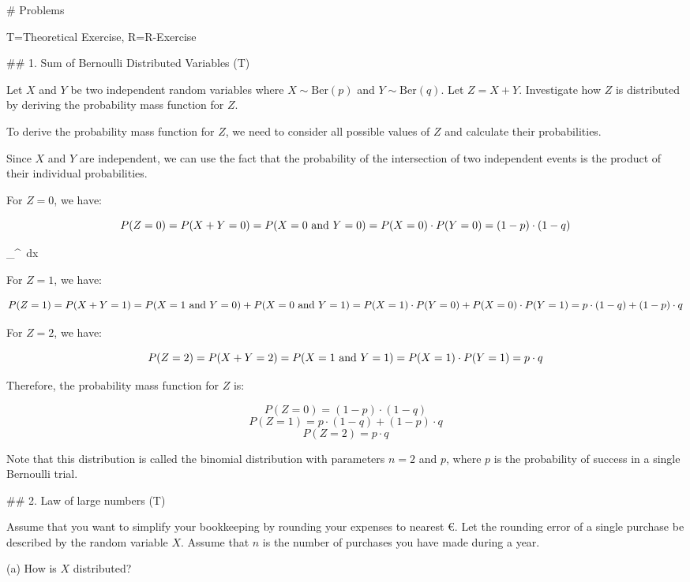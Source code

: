 \documentclass[20pt]{extbook}
\begin{document}
# Problems

T=Theoretical Exercise, R=R-Exercise

## 1. Sum of Bernoulli Distributed Variables (T)

Let $X$ and $Y$ be two independent random variables where $X \sim \mathrm{Ber}(p)$ and $Y \sim \mathrm{Ber}(q)$. Let $Z=X+Y$. Investigate how $Z$ is distributed by deriving the probability mass function for $Z$.

To derive the probability mass function for $Z$, we need to consider all possible values of $Z$ and calculate their probabilities.

Since $X$ and $Y$ are independent, we can use the fact that the probability of the intersection of two independent events is the product of their individual probabilities.

For $Z = 0$, we have:

$$P(Z = 0) = P(X + Y = 0) = P(X = 0 \text{ and } Y = 0) \\ = P(X = 0) \cdot P(Y = 0) 
= (1 - p) \cdot (1 - q)$$

\binom{}{}   \int_{}^{} \bullet \cdot  \,dx 

For $Z = 1$, we have:

$$P(Z = 1) = P(X + Y = 1) = P(X = 1 \text{ and } Y = 0) + P(X = 0 \text{ and } Y = 1) \\ = P(X = 1) \cdot P(Y = 0) + P(X = 0) \cdot P(Y = 1) = p \cdot (1 - q) + (1 - p) \cdot q$$

For $Z = 2$, we have:

$$P(Z = 2) = P(X + Y = 2) = P(X = 1 \text{ and } Y = 1) \\ = P(X = 1) \cdot P(Y = 1) = p \cdot q$$

Therefore, the probability mass function for $Z$ is:

$$P(Z = 0) = (1 - p) \cdot (1 - q)$$ $$P(Z = 1) = p \cdot (1 - q) + (1 - p) \cdot q$$ $$P(Z = 2) = p \cdot q$$

Note that this distribution is called the binomial distribution with parameters $n = 2$ and $p$, where $p$ is the probability of success in a single Bernoulli trial.

## 2. Law of large numbers (T)

Assume that you want to simplify your bookkeeping by rounding your expenses to nearest €. Let the rounding error of a single purchase be described by the random variable $X$. Assume that $n$ is the number of purchases you have made during a year.

(a) How is $X$ distributed?
\end{document}
